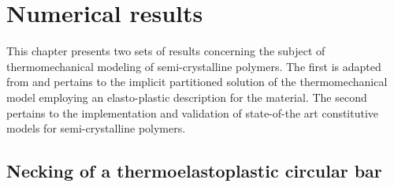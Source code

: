 \chapter{Numerical results} \label{ch:numerical_results}

This chapter presents two sets of results concerning the subject of thermomechanical modeling of semi-crystalline polymers.
The first is adapted from \cite{vila-chaNumericalAssessmentPartitioned2023a} and pertains to the implicit partitioned solution of the thermomechanical model employing an elasto-plastic description for the material.
The second pertains to the implementation and validation of state-of-the art constitutive models for semi-crystalline polymers.

\section{Necking of a thermoelastoplastic circular bar}
     \label{sec:mech-driv-probl}

